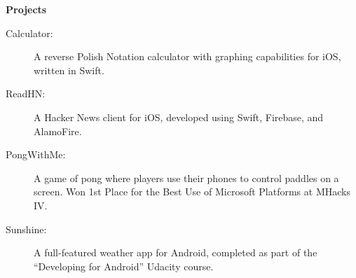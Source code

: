 \documentclass[letterpaper,11pt]{article}
\newcommand{\resheading}[1]{{\large \colorbox{mygrey}{\begin{minipage}{\textwidth}{\textbf{#1 \vphantom{p\^{E}}}}\end{minipage}}}}
\renewcommand{\footnotesize}{\fontsize{10pt}{11pt}\selectfont}
\begin{document}
		\resheading{Projects}
		
		\begin{description}
			\item[Calculator:] 
				{
					\footnotesize
					A reverse Polish Notation calculator with graphing capabilities for iOS, written in Swift.
				}
			\item[ReadHN:] 
				{
					\footnotesize
					A Hacker News client for iOS, developed using Swift, Firebase, and AlamoFire.
				}
			\item[PongWithMe:]
				{
					\footnotesize
					A game of pong where players use their phones to control paddles on a screen. Won 1st Place for the Best Use of Microsoft Platforms at MHacks IV.
				}
				
			\item[Sunshine:]
				{
					\footnotesize
					A full-featured weather app for Android, completed as part of the ``Developing for Android''  Udacity course.
				}
				
		\end{description}
		
\end{document}
